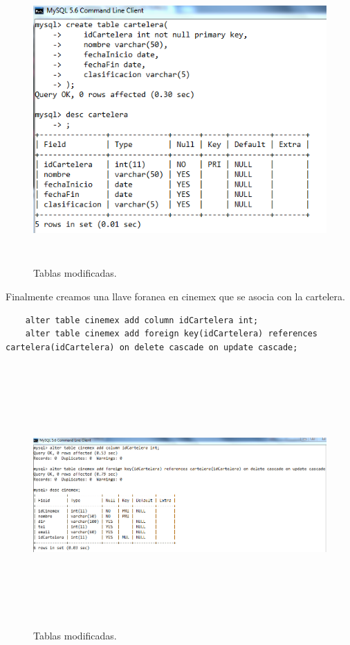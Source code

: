 \documentclass[12pt, titlepage]{article}
\begin{document}
    \begin{figure}[H]
        \begin{center}
            \includegraphics[width=16cm, height=11cm]{img/cartelera.png}
            \caption{Tablas modificadas.}
            \label{fig:foranea}
        \end{center}
    \end{figure}
    Finalmente creamos una llave foranea en cinemex que se asocia con la cartelera.
    \begin{lstlisting}
    alter table cinemex add column idCartelera int;
    alter table cinemex add foreign key(idCartelera) references cartelera(idCartelera) on delete cascade on update cascade;
    \end{lstlisting}
    \begin{figure}[H]
        \begin{center}
            \includegraphics[width=16cm, height=10cm]{img/foranea-cartelera.png}
            \caption{Tablas modificadas.}
            \label{fig:foranea-cartelera}
        \end{center}
    \end{figure}
\end{document}
